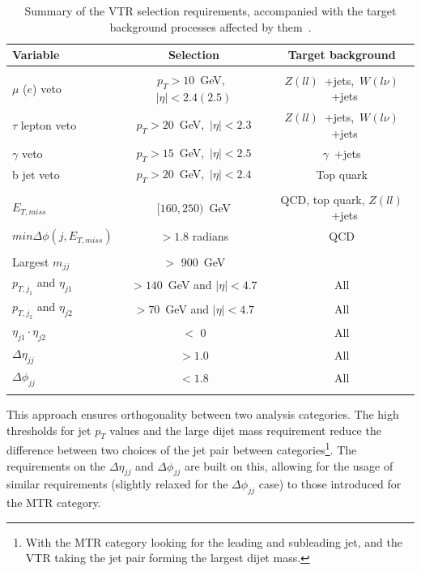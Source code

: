 \begin{table}[htbp]
\centering
\begin{tabular}{lcc}
    Variable                           & Selection                       & Target background \\
    \hline
     & & \\
    $\mu$ ($e$) veto               & $p_T > 10$~GeV,~$|\eta| < 2.4 (2.5)$  & $Z(ll)$~+jets,~$W(l\nu)$~+jets \\
    $\tau$ lepton veto                 & $p_T > 20$~GeV,~$|\eta| < 2.3$        & $Z(ll)$~+jets,~$W(l\nu)$~+jets  \\
    $\gamma$ veto                        & $p_T > 15$~GeV,~$|\eta| < 2.5$        & $\gamma$~+jets \\
    b jet veto                    &  $p_T > 20$~GeV,~$|\eta| < 2.4$  &  Top quark\\
        & & \\
    $E_{T,miss}$                          & $[160,250)$~GeV                          & QCD, top quark, $Z(ll)$~+jets \\
    $min\Delta\phi(j, E_{T,miss})$   &  $ {>} 1.8$ radians               & QCD \\
        & & \\
    Largest $m_{jj}$                               & ${>}$ 900~GeV  \\       
    $p_{T,j_1}$ and $\eta_{j1}$   & ${>} 140$~GeV and $ |\eta| < 4.7$      & All \\
    $p_{T,j_2}$ and $\eta_{j2}$   & ${>} 70$~GeV and $ |\eta| < 4.7$      & All \\
    $\eta_{j1}\cdot\eta_{j2}$   & ${<}$ 0   & All \\
    $\Delta\eta_{jj}$                            & ${>} 1.0$ & All  \\
    $\Delta\phi_{jj}$                            & ${<} 1.8$ & All  \\
      & & \\
         \hline
\end{tabular}
\caption{Summary of the VTR selection requirements, accompanied with the target background processes affected by them~\cite{note:AN_19_257}.}
\label{tab:selection_vtr}
\end{table}

\hspace{10pt} This approach ensures orthogonality between two analysis categories. The high thresholds for jet $p_T$ values and the large dijet mass requirement reduce the difference between two choices of the jet pair between categories\footnote{With the MTR category looking for the leading and subleading jet, and the VTR taking the jet pair forming the largest dijet mass.}. The requirements on the $\Delta\eta_{jj}$ and $\Delta\phi_{jj}$ are built on this, allowing for the usage of similar requirements (slightly relaxed for the $\Delta \phi_{jj}$ case) to those introduced for the MTR category.

